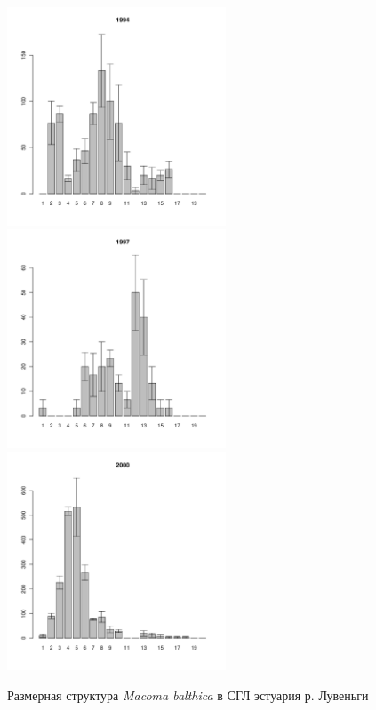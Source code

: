\documentclass[12pt, a4paper]{article}
\begin{document}
\begin{figure}[h]
\begin{multicols}{3}
\hfill
\includegraphics[width=65mm]{../White_Sea/Estuatiy_Luvenga/sizestr_1994_.pdf}
\hfill
\includegraphics[width=65mm]{../White_Sea/Estuatiy_Luvenga/sizestr_1997_.pdf}
\hfill
\includegraphics[width=65mm]{../White_Sea/Estuatiy_Luvenga/sizestr_2000_.pdf}
\end{multicols}



\caption{Размерная структура {\it Macoma balthica} в СГЛ эстуария р. Лувеньги}
\label{ris:size_str_estuary_Luv}
\end{figure}
\end{document}
